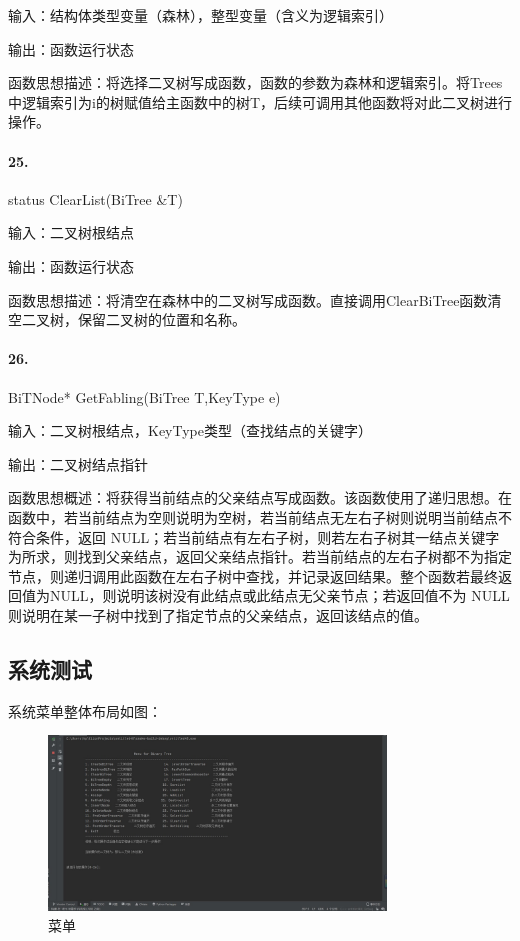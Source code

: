 \documentclass[supercite]{Experimental_Report}
\theoremstyle{definition}
\begin{document}
输入：结构体类型变量（森林），整型变量（含义为逻辑索引）

输出：函数运行状态

函数思想描述：将选择二叉树写成函数，函数的参数为森林和逻辑索引。将Trees中逻辑索引为i的树赋值给主函数中的树T，后续可调用其他函数将对此二叉树进行操作。

\paragraph{25.}status ClearList(BiTree \&T)

输入：二叉树根结点

输出：函数运行状态

函数思想描述：将清空在森林中的二叉树写成函数。直接调用ClearBiTree函数清空二叉树，保留二叉树的位置和名称。

\paragraph{26.}BiTNode* GetFabling(BiTree T,KeyType e)

输入：二叉树根结点，KeyType类型（查找结点的关键字）

输出：二叉树结点指针

函数思想概述：将获得当前结点的父亲结点写成函数。该函数使用了递归思想。在函数中，若当前结点为空则说明为空树，若当前结点无左右子树则说明当前结点不符合条件，返回 NULL；若当前结点有左右子树，则若左右子树其一结点关键字为所求，则找到父亲结点，返回父亲结点指针。若当前结点的左右子树都不为指定节点，则递归调用此函数在左右子树中查找，并记录返回结果。整个函数若最终返回值为NULL，则说明该树没有此结点或此结点无父亲节点；若返回值不为 NULL 则说明在某一子树中找到了指定节点的父亲结点，返回该结点的值。

\subsection{系统测试}

系统菜单整体布局如图：

 \begin{figure}[H]
 	\centering
 	\includegraphics[width=0.8\textwidth]{images/二叉树菜单.jpg}
 	\caption{菜单}
 	\label{txlab}
 \end{figure}
\end{document}
